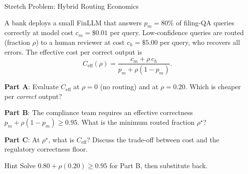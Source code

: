 \documentclass[9pt,t]{beamer}
\begin{document}
\begin{frame}[noframenumbering]{Stretch Problem: Hybrid Routing Economics}

A bank deploys a small FinLLM that answers $p_m = 80\%$ of filing-QA queries
correctly at model cost $c_m = \$0.01$ per query. Low-confidence queries are
routed (fraction $\rho$) to a human reviewer at cost $c_h = \$5.00$ per query,
who recovers all errors. The effective cost per correct output is
\[
  C_{\text{eff}}(\rho) = \frac{c_m + \rho\,c_h}{p_m + \rho(1-p_m)}.
\]

\medskip
\textbf{Part A}: Evaluate $C_{\text{eff}}$ at $\rho = 0$ (no routing) and at
$\rho = 0.20$. Which is cheaper per \emph{correct} output?

\textbf{Part B}: The compliance team requires an effective correctness
$p_m + \rho(1-p_m) \ge 0.95$. What is the minimum routed fraction $\rho^\star$?

\textbf{Part C}: At $\rho^\star$, what is $C_{\text{eff}}$? Discuss the trade-off
between cost and the regulatory correctness floor.

\medskip
\begin{block}{Hint}
  Solve $0.80 + \rho(0.20) \ge 0.95$ for Part B, then substitute back.
\end{block}
\end{frame}
\end{document}
